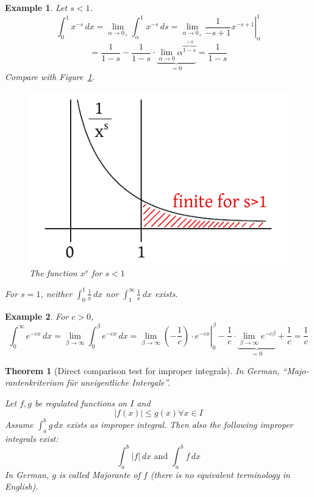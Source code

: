 \documentclass{article}
\newtheorem{theorem}{Theorem}  \numberwithin{theorem}{section}
\newtheorem{example}{Example}  \numberwithin{example}{section}
\newcommand{\card}[1]{\left|#1\right|}
\begin{document}
\begin{example}
  Let $s < 1$.
  \[
    \int_0^1 x^{-s} \, dx = \lim_{\alpha \to 0_+} \int_\alpha^1 x^{-s} \, ds
    = \left. \lim_{\alpha\to 0_+} \frac{1}{-s + 1} x^{-s+1} \right|_\alpha^1
  \] \[
    = \frac1{1 - s} - \frac1{1 - s} \cdot \underbrace{\lim_{\alpha \to 0} \alpha^{\overbrace{1 - s}^{> 0}}}_{= 0} = \frac1{1 - s}
  \]
  Compare with Figure~\ref{img:xs1}.
  \begin{figure}[t]
    \begin{center}
      \includegraphics{img/21b_1_by_xs.pdf}
      \caption{The function ${x^s}$ for $s < 1$}
      \label{img:xs1}
    \end{center}
  \end{figure}

  For $s = 1$, neither $\int_0^1 \frac1x \, dx$ nor $\int_1^\infty \frac1x \, dx$ exists.
\end{example}

\begin{example}
  For $c > 0$,
  \[ \int_0^\infty e^{-cx} \, dx = \lim_{\beta \to \infty} \int_0^\beta e^{-cx} \, dx = \left. \lim_{\beta \to \infty} \left(-\frac1c\right) \cdot e^{-cx} \right|_0^\beta - \frac1c \cdot \underbrace{\lim_{\beta \to \infty} e^{-c\beta}}_{= 0} + \frac1c = \frac1c \]
\end{example}

\begin{theorem}[Direct comparison test for improper integrals] %
  \label{dctii}
  In German, \enquote{\foreignlanguage{german}{Majorantenkriterium f\"ur uneigentliche Intergale}}.

  Let $f, g$ be regulated functions on $I$ and
  \[ \card{f(x)} \leq g(x) \forall x \in I \]
  Assume $\int_a^b g \, dx$ exists as improper integral. Then also the following improper integrals exist:
  \[ \int_a^b \card{f} \, dx \text{ and } \int_a^b f \, dx \]
  In German, $g$ is called \foreignlanguage{german}{Majorante} of $f$ (there is no equivalent terminology in English).
\end{theorem}
\end{document}
